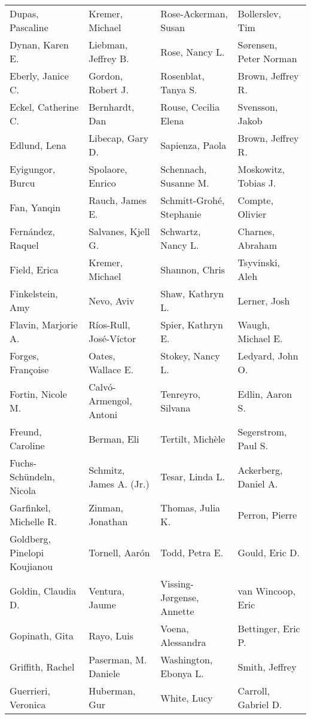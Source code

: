 \begin{ThreePartTable}
{\begin{longtable}[c]{llll}
            Dupas, Pascaline&Kremer, Michael&Rose-Ackerman, Susan&Bollerslev, Tim\\
            Dynan, Karen E.&Liebman, Jeffrey B.&Rose, Nancy L.&Sørensen, Peter Norman\\
            Eberly, Janice C.&Gordon, Robert J.&Rosenblat, Tanya S.&Brown, Jeffrey R.\\
            Eckel, Catherine C.&Bernhardt, Dan&Rouse, Cecilia Elena&Svensson, Jakob\\
            Edlund, Lena&Libecap, Gary D.&Sapienza, Paola&Brown, Jeffrey R.\\
            Eyigungor, Burcu&Spolaore, Enrico&Schennach, Susanne M.&Moskowitz, Tobias J.\\
            Fan, Yanqin&Rauch, James E.&Schmitt-Grohé, Stephanie&Compte, Olivier\\
            Fernández, Raquel&Salvanes, Kjell G.&Schwartz, Nancy L.&Charnes, Abraham\\
            Field, Erica&Kremer, Michael&Shannon, Chris&Tsyvinski, Aleh\\
            Finkelstein, Amy&Nevo, Aviv&Shaw, Kathryn L.&Lerner, Josh\\
            Flavin, Marjorie A.&Ríos-Rull, José-Víctor&Spier, Kathryn E.&Waugh, Michael E.\\
            Forges, Françoise&Oates, Wallace E.&Stokey, Nancy L.&Ledyard, John O.\\
            Fortin, Nicole M.&Calvó-Armengol, Antoni&Tenreyro, Silvana&Edlin, Aaron S.\\
            Freund, Caroline&Berman, Eli&Tertilt, Michèle&Segerstrom, Paul S.\\
            Fuchs-Schündeln, Nicola&Schmitz, James A. (Jr.)&Tesar, Linda L.&Ackerberg, Daniel A.\\
            Garfinkel, Michelle R.&Zinman, Jonathan&Thomas, Julia K.&Perron, Pierre\\
            Goldberg, Pinelopi Koujianou&Tornell, Aarón&Todd, Petra E.&Gould, Eric D.\\
            Goldin, Claudia D.&Ventura, Jaume&Vissing-Jørgense, Annette&van Wincoop, Eric\\
            Gopinath, Gita&Rayo, Luis&Voena, Alessandra&Bettinger, Eric P.\\
            Griffith, Rachel&Paserman, M. Daniele&Washington, Ebonya L.&Smith, Jeffrey\\
            Guerrieri, Veronica&Huberman, Gur&White, Lucy&Carroll, Gabriel D.\\

\end{longtable}}
\end{ThreePartTable}
